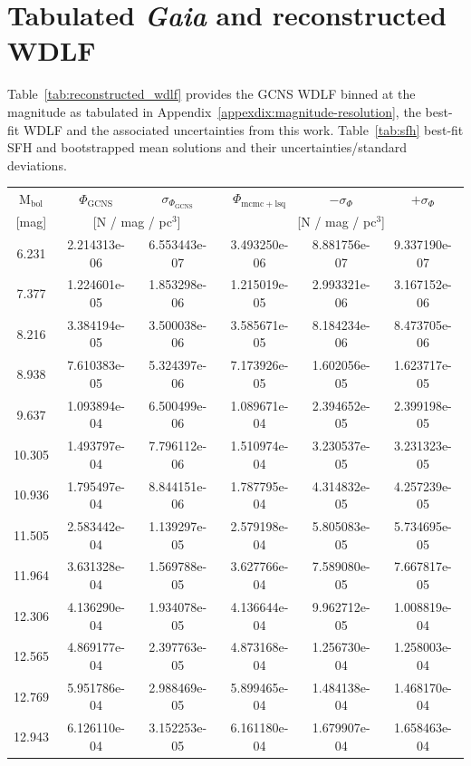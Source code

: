 \documentclass[fleqn,usenatbib]{mnras}
\begin{document}
\section{Tabulated \textit{Gaia} and reconstructed WDLF}
\label{appexdix:reconstructed-wdlf}
Table~\ref{tab:reconstructed_wdlf} provides the GCNS WDLF binned at the magnitude as tabulated in 
Appendix~\ref{appexdix:magnitude-resolution}, the best-fit WDLF and the
associated uncertainties from this work. Table~\ref{tab:sfh} best-fit SFH and bootstrapped
mean solutions and their uncertainties/standard deviations.
\begin{table}
    \centering
    \begin{tabular}{c|cc|ccc}
         M$_{\mathrm{bol}}$ & $\Phi_{\mathrm{GCNS}}$ & $\sigma_{\Phi_{\mathrm{GCNS}}}$ & $\Phi_{\mathrm{mcmc + lsq}}$ & $-\sigma_{\Phi}$ & $+\sigma_{\Phi}$ \\
         {[mag]} & \multicolumn{2}{c|}{[N / mag / pc$^3$]} & \multicolumn{3}{c}{[N / mag / pc$^3$]} \\\hline\hline
6.231  & 2.214313e-06 & 6.553443e-07 & 3.493250e-06 & 8.881756e-07 & 9.337190e-07 \\
7.377  & 1.224601e-05 & 1.853298e-06 & 1.215019e-05 & 2.993321e-06 & 3.167152e-06 \\
8.216  & 3.384194e-05 & 3.500038e-06 & 3.585671e-05 & 8.184234e-06 & 8.473705e-06 \\
8.938  & 7.610383e-05 & 5.324397e-06 & 7.173926e-05 & 1.602056e-05 & 1.623717e-05 \\
9.637  & 1.093894e-04 & 6.500499e-06 & 1.089671e-04 & 2.394652e-05 & 2.399198e-05 \\ \hline
10.305 & 1.493797e-04 & 7.796112e-06 & 1.510974e-04 & 3.230537e-05 & 3.231323e-05 \\
10.936 & 1.795497e-04 & 8.844151e-06 & 1.787795e-04 & 4.314832e-05 & 4.257239e-05 \\
11.505 & 2.583442e-04 & 1.139297e-05 & 2.579198e-04 & 5.805083e-05 & 5.734695e-05 \\
11.964 & 3.631328e-04 & 1.569788e-05 & 3.627766e-04 & 7.589080e-05 & 7.667817e-05 \\
12.306 & 4.136290e-04 & 1.934078e-05 & 4.136644e-04 & 9.962712e-05 & 1.008819e-04 \\ \hline
12.565 & 4.869177e-04 & 2.397763e-05 & 4.873168e-04 & 1.256730e-04 & 1.258003e-04 \\
12.769 & 5.951786e-04 & 2.988469e-05 & 5.899465e-04 & 1.484138e-04 & 1.468170e-04 \\
12.943 & 6.126110e-04 & 3.152253e-05 & 6.161180e-04 & 1.679907e-04 & 1.658463e-04 \\

\end{tabular}
\end{table}
\end{document}
